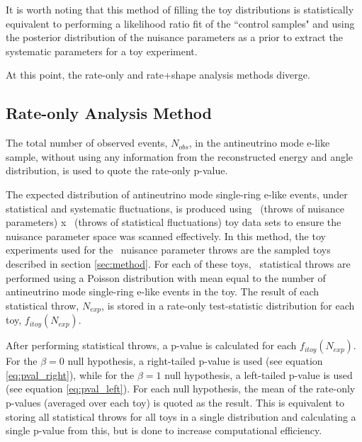 It is worth noting that this method of filling the toy distributions is statistically equivalent to performing a likelihood ratio fit of the ``control samples" and using the posterior distribution of the nuisance parameters as a prior to extract the systematic parameters for a toy experiment.

At this point, the rate-only and rate+shape analysis methods diverge.



\subsection{Rate-only Analysis Method}
\label{sec:method_rate-only}

The total number of observed events, $N_{obs}$, in the antineutrino mode e-like sample, without using any information from the reconstructed energy and angle distribution, is used to quote the rate-only p-value. 

The expected distribution of antineutrino mode single-ring e-like events, under statistical and systematic fluctuations, is produced using \NToysFakeDataRateOnly\ (throws of nuisance parameters) x \NStatThrows\ (throws of statistical fluctuations) toy data sets to ensure the nuisance parameter space was scanned effectively. In this method, the toy experiments used for the \NToysFakeDataRateOnly\ nuisance parameter throws are the sampled toys described in section \ref{sec:method}. For each of these toys, \NStatThrows\ statistical throws are performed using a Poisson distribution with mean equal to the number of antineutrino mode single-ring e-like events in the toy. The result of each statistical throw, $N_{exp}$, is stored in {\color{red}a rate-only test-statistic distribution for each toy, $f_{itoy} \left( N_{exp} \right)$.} %


After performing statistical throws, a p-value is calculated for {\color{red} each $f_{itoy} \left( N_{exp} \right)$. } For the $\beta = 0$ null hypothesis, a right-tailed p-value is used (see equation \ref{eq:pval_right}), while for the $\beta = 1$ null hypothesis, a left-tailed p-value is used (see equation \ref{eq:pval_left}). {\color{red}For each null hypothesis, the mean of the rate-only p-values (averaged over each toy) is quoted as the result. This is equivalent to storing all statistical throws for all toys in a single distribution and calculating a single p-value from this, but is done to increase computational efficiency. } %

